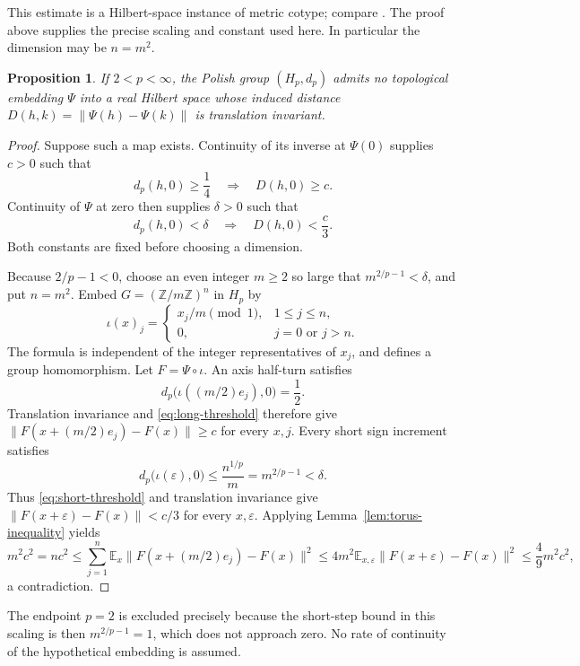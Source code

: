 \documentclass[11pt]{article}
\newtheorem{proposition}[theorem]{Proposition}
\theoremstyle{definition}
\newcommand{\Z}{\mathbb Z}
\newcommand{\E}{\mathbb E}
\begin{document}
This estimate is a Hilbert-space instance of metric cotype; compare
\cite[Proposition 3.1]{MN}. The proof above supplies the precise scaling
and constant used here. In particular the dimension may be $n=m^2$.

\begin{proposition}\label{prop:lp-obstruction}
If $2<p<\infty$, the Polish group $(H_p,d_p)$ admits no topological embedding
$\Psi$ into a real Hilbert space whose induced distance
$D(h,k)=\|\Psi(h)-\Psi(k)\|$ is translation invariant.
\end{proposition}
\begin{proof}
Suppose such a map exists. Continuity of its inverse at $\Psi(0)$
supplies $c>0$ such that
\begin{equation}\label{eq:long-threshold}
 d_p(h,0)\ge\frac14\quad\Longrightarrow\quad D(h,0)\ge c.
\end{equation}
Continuity of $\Psi$ at zero then supplies $\delta>0$ such that
\begin{equation}\label{eq:short-threshold}
 d_p(h,0)<\delta\quad\Longrightarrow\quad D(h,0)<\frac c3.
\end{equation}
Both constants are fixed before choosing a dimension.

Because $2/p-1<0$, choose an even integer $m\ge2$ so large that
$m^{2/p-1}<\delta$, and put $n=m^2$. Embed $G=(\Z/m\Z)^n$ in $H_p$
by
\[
 \iota(x)_j=\begin{cases}x_j/m\pmod1,&1\le j\le n,\\0,&j=0\text{ or }j>n.
 \end{cases}
\]
The formula is independent of the integer representatives of $x_j$,
and defines a group homomorphism. Let $F=\Psi\circ\iota$.
An axis half-turn satisfies
\[
 d_p\bigl(\iota((m/2)e_j),0\bigr)=\frac12.
\]
Translation invariance and \eqref{eq:long-threshold} therefore give
$\|F(x+(m/2)e_j)-F(x)\|\ge c$ for every $x,j$. Every short sign
increment satisfies
\[
 d_p\bigl(\iota(\varepsilon),0\bigr)
 \le\frac{n^{1/p}}m=m^{2/p-1}<\delta.
\]
Thus \eqref{eq:short-threshold} and translation invariance give
$\|F(x+\varepsilon)-F(x)\|<c/3$ for every $x,\varepsilon$.
Applying Lemma~\ref{lem:torus-inequality} yields
\[
 m^2c^2=nc^2
 \le\sum_{j=1}^n\E_x\|F(x+(m/2)e_j)-F(x)\|^2
 \le4m^2\E_{x,\varepsilon}\|F(x+\varepsilon)-F(x)\|^2
 \le\frac49m^2c^2,
\]
a contradiction.
\end{proof}

The endpoint $p=2$ is excluded precisely because the short-step bound
in this scaling is then $m^{2/p-1}=1$, which does not approach zero.
No rate of continuity of the hypothetical embedding is assumed.
\end{document}
